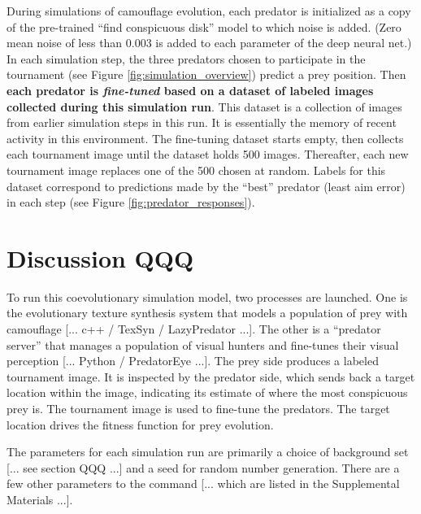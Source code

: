 \documentclass[acmtog]{acmart}
\newcommand{\jargon}[1]{\textit{#1}}
\begin{document}
\par
During simulations of camouflage evolution, each predator is initialized as a copy of the pre-trained “find conspicuous disk” model to which noise is added. (Zero mean noise of less than 0.003 is added to each parameter of the deep neural net.) In each simulation step, the three predators chosen to participate in the tournament (see Figure \ref{fig:simulation_overview}) predict a prey position. Then \textbf{each predator is \jargon{fine-tuned} based on a dataset of labeled images collected during this simulation run}. This dataset is a collection of images from earlier simulation steps in this run. It is essentially the memory of recent activity in this environment. The fine-tuning dataset starts empty, then collects each tournament image until the dataset holds 500 images. Thereafter, each new tournament image replaces one of the 500 chosen at random. Labels for this dataset correspond to predictions made by the “best” predator (least aim error) in each step (see Figure \ref{fig:predator_responses}).
\par


\section{Discussion QQQ}
To run this coevolutionary simulation model, two processes are launched. One is the evolutionary texture synthesis system that models a population of prey with camouflage [... c++ / TexSyn / LazyPredator ...]. The other is a “predator server” that manages a population of visual hunters and fine-tunes their visual perception [... Python / PredatorEye ...]. The prey side produces a labeled tournament image. It is inspected by the predator side, which sends back a target location within the image, indicating its estimate of where the most conspicuous prey is. The tournament image is used to fine-tune the predators. The target location drives the fitness function for prey evolution.
\par
The parameters for each simulation run are primarily a choice of background set [... see section QQQ ...] and a seed for random number generation. There are a few other parameters to the command [... which are listed in the Supplemental Materials ...].
\par
[... QQQ ...]

\end{document}
